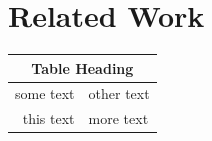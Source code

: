 \documentclass[12pt,twoside,a4paper]{article}
\begin{document}
\lipsum[1-4]

\section{Related Work}
\singlespacing

\lipsum[5-6]

\begin{table}[ht]

	\begin{tabular}{ | r | l | }
    	\hline
    	\multicolumn{2}{|c|}{Table Heading} \\
    	\hline
    		some text & other text \\
			this text & more text \\
    	\hline
	\end{tabular}

\end{table}
\end{document}
